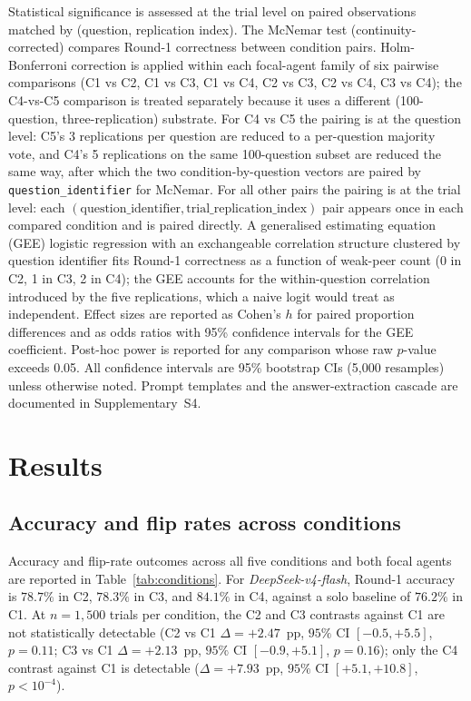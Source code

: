 \documentclass[review,3p,authoryear]{elsarticle}
\begin{document}
Statistical significance is assessed at the trial level on paired
observations matched by (question, replication index).
The McNemar test (continuity-corrected) compares Round-1 correctness
between condition pairs.
Holm-Bonferroni correction is applied within each focal-agent family of
six pairwise comparisons (C1 vs C2, C1 vs C3, C1 vs C4, C2 vs C3,
C2 vs C4, C3 vs C4); the C4-vs-C5 comparison is treated separately
because it uses a different (100-question, three-replication) substrate.
For C4 vs C5 the pairing is at the question level: C5's 3 replications
per question are reduced to a per-question majority vote, and C4's
5 replications on the same 100-question subset are reduced the same
way, after which the two condition-by-question vectors are paired by
\texttt{question\_identifier} for McNemar.
For all other pairs the pairing is at the trial level: each
$(\text{question\_identifier}, \text{trial\_replication\_index})$
pair appears once in each compared condition and is paired directly.
A generalised estimating equation (GEE) logistic regression with an
exchangeable correlation structure clustered by question identifier
fits Round-1 correctness as a function of weak-peer count (0 in C2,
1 in C3, 2 in C4); the GEE accounts for the within-question correlation
introduced by the five replications, which a naive logit would treat as
independent.
Effect sizes are reported as Cohen's $h$ for paired proportion
differences and as odds ratios with 95\% confidence intervals for the
GEE coefficient.
Post-hoc power is reported for any comparison whose raw $p$-value
exceeds 0.05.
All confidence intervals are 95\% bootstrap CIs (5{,}000 resamples)
unless otherwise noted.
Prompt templates and the answer-extraction cascade are documented in
Supplementary~S4.

\section{Results}
\label{sec:results}

\subsection{Accuracy and flip rates across conditions}
\label{sub:accuracy}

Accuracy and flip-rate outcomes across all five conditions and both focal
agents are reported in Table~\ref{tab:conditions}.
For \textit{DeepSeek-v4-flash}, Round-1 accuracy is $78.7\%$ in C2,
$78.3\%$ in C3, and $84.1\%$ in C4, against a solo baseline of
$76.2\%$ in C1.
At $n = 1{,}500$ trials per condition, the C2 and C3 contrasts against
C1 are not statistically detectable (C2 vs C1 $\Delta = +2.47$~pp,
$95\%$ CI $[-0.5, +5.5]$, $p = 0.11$; C3 vs C1 $\Delta = +2.13$~pp,
$95\%$ CI $[-0.9, +5.1]$, $p = 0.16$); only the C4 contrast against C1
is detectable ($\Delta = +7.93$~pp, $95\%$ CI $[+5.1, +10.8]$,
$p < 10^{-4}$).
\end{document}
